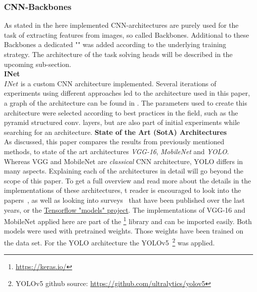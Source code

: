 \subsubsection{CNN-Backbones}
As stated in  the here implemented CNN-architectures are purely used for the task of extracting features from images, so called Backbones.
Additional to these Backbones a dedicated "" was added according to the underlying training strategy.
The architecture of the task solving heads will be described in the upcoming sub-section.\\
\textbf{INet}\\
$INet$ is a custom CNN architecture implemented.
Several iterations of experiments using different approaches led to the architecture used in this paper, a graph of the architecture can be found in .
The parameters used to create this architecture were selected according to best practices in the field, such as the pyramid structured conv. layers, but are also part of initial experiments while searching for an architecture.
\newline
\textbf{State of the Art (SotA) Architectures}\\
As discussed, this paper compares the results from previously mentioned methods, to state of the art architectures \textit{VGG-16}, \textit{MobileNet} and \textit{YOLO}.
Whereas VGG and MobileNet are \textit{classical} CNN architecture, YOLO differs in many aspects.
Explaining each of the architectures in detail will go beyond the scope of this paper.
To get a full overview and read more about the details in the implementations of these architectures,
t reader is encouraged to look into the papers~\cite{VGG16, MobileNet, yolo}, as well as looking into surveys~\cite{Jiao_2019} that have been published over the last years, or the \href{https://github.com/tensorflow/models}{Tensorflow "models" project}.
The implementations of VGG-16 and MobileNet applied here are part of the \footnote{\url{https://keras.io/}} library and can be imported easily. Both models were used with pretrained weights. Those weights have been trained on the  data set.
For the YOLO architecture the YOLOv5~\footnote{
    YOLOv5 github source: \url{https://github.com/ultralytics/yolov5}
} was applied.
